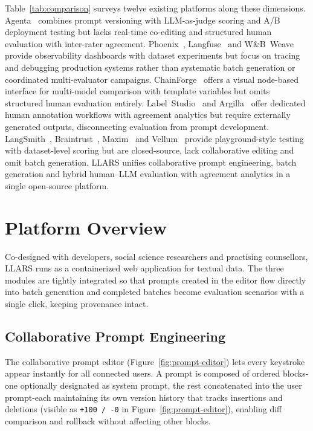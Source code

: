 \documentclass{article}
\begin{document}
Table~\ref{tab:comparison} surveys twelve existing platforms along these dimensions.
Agenta~\cite{agenta2024} combines prompt versioning with LLM-as-judge scoring and A/B deployment testing but lacks real-time co-editing and structured human evaluation with inter-rater agreement.
Phoenix~\cite{phoenix2024}, Langfuse~\cite{langfuse2024} and W\&B~Weave~\cite{weave2024} provide observability dashboards with dataset experiments but focus on tracing and debugging production systems rather than systematic batch generation or coordinated multi-evaluator campaigns.
ChainForge~\cite{arawjo2024chainforge} offers a visual node-based interface for multi-model comparison with template variables but omits structured human evaluation entirely.
Label~Studio~\cite{labelstudio2024} and Argilla~\cite{argilla2024} offer dedicated human annotation workflows with agreement analytics but require externally generated outputs, disconnecting evaluation from prompt development.
LangSmith~\cite{langsmith2024}, Braintrust~\cite{braintrust2024}, Maxim~\cite{maxim2024} and Vellum~\cite{vellum2024} provide playground-style testing with dataset-level scoring but are closed-source, lack collaborative editing and omit batch generation.
LLARS unifies collaborative prompt engineering, batch generation and hybrid human--LLM evaluation with agreement analytics in a single open-source platform.


\section{Platform Overview}

Co-designed with developers, social science researchers and practising counsellors, LLARS runs as a containerized web application for textual data.
The three modules are tightly integrated so that prompts created in the editor flow directly into batch generation and completed batches become evaluation scenarios with a single click, keeping provenance intact.

\subsection{Collaborative Prompt Engineering}

The collaborative prompt editor (Figure~\ref{fig:prompt-editor}) lets every keystroke appear instantly for all connected users.
A prompt is composed of ordered blocks\--one optionally designated as system prompt, the rest concatenated into the user prompt\--each maintaining its own version history that tracks insertions and deletions (visible as \texttt{+100\,/\,{-}0} in Figure~\ref{fig:prompt-editor}), enabling diff comparison and rollback without affecting other blocks.
\end{document}
